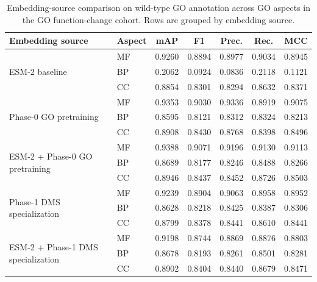 \documentclass[11pt,a4paper]{article}
\begin{document}
\begin{table}[H]
\centering
\scriptsize
\setlength{\tabcolsep}{4pt}
\renewcommand{\arraystretch}{1.08}
\caption{Embedding-source comparison on wild-type GO annotation across GO aspects in the GO function-change cohort. Rows are grouped by embedding source.}
\label{tab:wt-embedding-results}
\begin{tabular}{@{}l l ccccc@{}}
\toprule
\textbf{Embedding source} & \textbf{Aspect} & mAP & F1 & Prec. & Rec. & MCC \\
\midrule
\multirow{3}{*}{\parbox{2.6cm}{\raggedright ESM-2 baseline}} & MF & 0.9260 & 0.8894 & 0.8977 & 0.9034 & 0.8945 \\
 & BP & 0.2062 & 0.0924 & 0.0836 & 0.2118 & 0.1121 \\
 & CC & 0.8854 & 0.8301 & 0.8294 & 0.8632 & 0.8371 \\
\midrule
\multirow{3}{*}{\parbox{2.6cm}{\raggedright Phase-0 GO pretraining}} & MF & 0.9353 & 0.9030 & 0.9336 & 0.8919 & 0.9075 \\
 & BP & 0.8595 & 0.8121 & 0.8312 & 0.8324 & 0.8213 \\
 & CC & 0.8908 & 0.8430 & 0.8768 & 0.8398 & 0.8496 \\
\midrule
\multirow{3}{*}{\parbox{2.6cm}{\raggedright ESM-2 + Phase-0 GO pretraining}} & MF & 0.9388 & 0.9071 & 0.9196 & 0.9130 & 0.9113 \\
 & BP & 0.8689 & 0.8177 & 0.8246 & 0.8488 & 0.8266 \\
 & CC & 0.8946 & 0.8437 & 0.8452 & 0.8726 & 0.8503 \\
\midrule
\multirow{3}{*}{\parbox{2.6cm}{\raggedright Phase-1 DMS specialization}} & MF & 0.9239 & 0.8904 & 0.9063 & 0.8958 & 0.8952 \\
 & BP & 0.8628 & 0.8218 & 0.8425 & 0.8387 & 0.8306 \\
 & CC & 0.8799 & 0.8378 & 0.8441 & 0.8610 & 0.8441 \\
\midrule
\multirow{3}{*}{\parbox{2.6cm}{\raggedright ESM-2 + Phase-1 DMS specialization}} & MF & 0.9198 & 0.8744 & 0.8869 & 0.8876 & 0.8803 \\
 & BP & 0.8678 & 0.8193 & 0.8261 & 0.8501 & 0.8281 \\
 & CC & 0.8902 & 0.8404 & 0.8440 & 0.8679 & 0.8471 \\
\bottomrule
\end{tabular}
\end{table}
\end{document}
